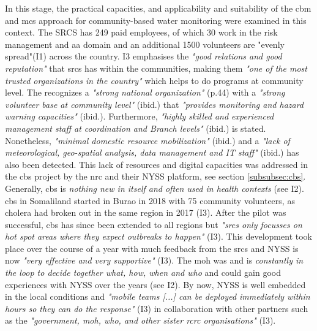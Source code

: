 In this stage, the practical capacities, and applicability and suitability of the \acrshort{cbm} and \acrshort{mcs} approach for community-based water monitoring were examined in this context. The SRCS has 249 paid employees, of which 30 work in the risk management and \acrlong{aa} domain and an additional 1500 volunteers are "evenly spread"(I1) across the country. I3 emphasises the \textit{"good relations and good reputation"} that \acrshort{srcs} has within the communities, making them \textit{"one of the most trusted organizations in the country"} which helps to do programs at community level. The  \autocite{scrsFeasibilityStudyPotential2022} recognizes a \textit{"strong national organization"} (p.44) with a \textit{"strong volunteer base at community level"} (ibid.) that \textit{"provides monitoring and hazard warning capacities"} (ibid.). Furthermore, \textit{"highly skilled and experienced management staff at coordination and Branch levels"} (ibid.) is stated. Nonetheless, \textit{"minimal domestic resource mobilization"} (ibid.) and a \textit{"lack of meteorological, geo-spatial analysis, data management and IT staff"} (ibid.) has also been detected.\newline
This lack of resources and digital capacities was addressed in the \acrshort{cbs} project by the \acrshort{nrc} and their NYSS platform, see section \ref{subsubsec:cbs}. Generally, \acrshort{cbs} is \textit{nothing new in itself and often used in health contexts} (see I2). \acrshort{cbs} in Somaliland started in Burao in 2018 with 75 community volunteers, as cholera had broken out in the same region in 2017 (I3). After the pilot was successful, \acrshort{cbs} has since been extended to all regions but \textit{"\acrshort{srcs} only focusses on hot spot areas where they expect outbreaks to happen"} (I3). This development took place over the course of a year with much feedback from the \acrshort{srcs} and NYSS is now \textit{"very effective and very supportive"} (I3). The \acrfull{moh} was and is \textit{constantly in the loop to decide together what, how, when and who} and could gain good experiences with NYSS over the years (see I2). By now, NYSS is well embedded in the local conditions and \textit{"mobile teams [...] can be deployed immediately within hours so they can do the response"} (I3) in collaboration with other partners such as the \textit{"government, \acrshort{moh}, \acrshort{who}, and other sister \acrshort{rcrc} organisations"} (I3).\newline
